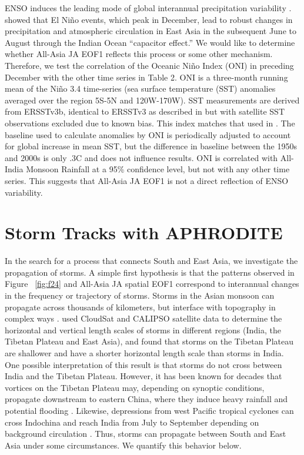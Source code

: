 	ENSO induces the leading mode of global interannual precipitation variability \citep{Dai1997}. \cite{Xie2009} showed that El Ni\~no events, which peak in December, lead to robust changes in precipitation and atmospheric circulation in East Asia in the subsequent June to August through the Indian Ocean ``capacitor effect.'' We would like to determine whether All-Asia JA EOF1 reflects this process or some other mechanism. Therefore, we test the correlation of the Oceanic Ni\~no Index (ONI) in preceding December with the other time series in Table 2. ONI is a three-month running mean of the Ni\~no 3.4 time-series (sea surface temperature (SST) anomalies averaged over the region 5\textdegree S-5\textdegree N and 120\textdegree W-170\textdegree W). SST measurements are derived from ERSSTv3b, identical to ERSSTv3 as described in \cite{Smith2008} but with satellite SST observations excluded due to known bias. This index matches that used in \cite{Xie2009}. The baseline used to calculate anomalies by ONI is periodically adjusted to account for global increase in mean SST, but the difference in baseline between the 1950s and 2000s is only .3\textdegree C and does not influence results. ONI is correlated with All-India Monsoon Rainfall at a 95\% confidence level, but not with any other time series. This suggests that All-Asia JA EOF1 is not a direct reflection of ENSO variability.

\section{Storm Tracks with APHRODITE}
	
	In the search for a process that connects South and East Asia, we investigate the propagation of storms. A simple first hypothesis is that the patterns observed in Figure ~\ref{fig:f24} and All-Asia JA spatial EOF1 correspond to interannual changes in the frequency or trajectory of storms. Storms in the Asian monsoon can propagate across thousands of kilometers, but interface with topography in complex ways \parencite{Romatschke2011a}. \cite{Luo2011} used CloudSat and CALIPSO satellite data to determine the horizontal and vertical length scales of storms in different regions (India, the Tibetan Plateau and East Asia), and found that storms on the Tibetan Plateau are shallower and have a shorter horizontal length scale than storms in India. One possible interpretation of this result is that storms do not cross between India and the Tibetan Plateau. However, it has been known for decades that vortices on the Tibetan Plateau may, depending on synoptic conditions, propagate downstream to eastern China, where they induce heavy rainfall and potential flooding \parencite{Tao1981,Murakami1984,Chen1984,Yasunari2006,Xu2011,Wang2012a}. Likewise, depressions from west Pacific tropical cyclones can cross Indochina and reach India from July to September depending on background circulation \parencite{Chen1999,Fudeyasu2006}. Thus, storms can propagate between South and East Asia under some circumstances. We quantify this behavior below.
	
